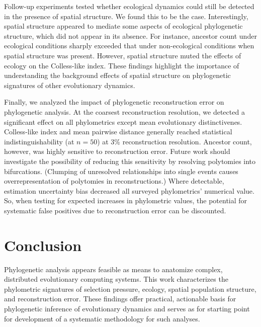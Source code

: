 Follow-up experiments tested whether ecological dynamics could still be detected in the presence of spatial structure.
We found this to be the case.
Interestingly, spatial structure appeared to mediate some aspects of ecological phylogenetic structure, which did not appear in its absence.
For instance, ancestor count under ecological conditions sharply exceeded that under non-ecological conditions when spatial structure was present.
However, spatial structure muted the effects of ecology on the Colless-like index.
These findings highlight the importance of understanding the background effects of spatial structure on phylogenetic signatures of other evolutionary dynamics.

Finally, we analyzed the impact of phylogenetic reconstruction error on phylogenetic analysis.
At the coarsest reconstruction resolution, we detected a significant effect on all phylometrics except mean evolutionary distinctivenes.
Colless-like index and mean pairwise distance generally reached statistical indistinguishability (at $n=50$) at 3\% reconstruction resolution.
Ancestor count, however, was highly sensitive to reconstruction error.
Future work should investigate the possibility of reducing this sensitivity by resolving polytomies into bifurcations.
(Clumping of unresolved relationships into single events causes overrepresentation of polytomies in reconstructions.)
Where detectable, estimation uncertainty bias decreased all surveyed phylometrics' numerical value.
So, when testing for expected increases in phylometric values, the potential for systematic false positives due to reconstruction error can be discounted.

\vspace{-1.5ex}
\section{Conclusion}

Phylogenetic analysis appears feasible as means to anatomize complex, distributed evolutionary computing systems.
This work characterizes the phylometric signatures of selection pressure, ecology, spatial population structure, and reconstruction error.
These findings offer practical, actionable basis for phylogenetic inference of evolutionary dynamics and serves as for starting point for development of a systematic methodology for such analyses.
